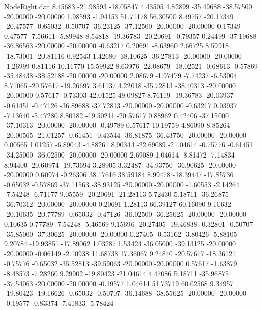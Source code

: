 \begin{filecontents}{NodeRight.dat}
   8.45683  -21.98593  -18.05847     4.43505    4.82899  -35.49688  -38.57500  -20.00000  -20.00000    1.98593   -1.94153   51.71178   56.30500
   8.49757  -20.17349  -20.47577    -0.65032   -0.50707  -36.23125  -37.12500  -20.00000  -20.00000    0.17349    0.47577   -7.56611   -5.89948
   8.54818  -19.36783  -20.20691    -0.79357    0.24499  -37.19688  -36.86563  -20.00000  -20.00000   -0.63217    0.20691   -8.63960    2.66725
   8.59918  -18.73001  -20.81116     0.92543    1.42680  -38.10625  -36.27813  -20.00000  -20.00000   -1.26999    0.81116   10.11770   15.59922
   8.63976  -22.08679  -18.02521    -0.68613   -0.57869  -35.48438  -38.52188  -20.00000  -20.00000    2.08679   -1.97479   -7.74237   -6.53004
   8.71065  -20.57617  -19.26697     3.61137    4.22018  -35.72813  -38.40313  -20.00000  -20.00000    0.57617   -0.73303   42.01525   49.09827
   8.76119  -19.36783  -20.03937    -0.61451   -0.47126  -36.89688  -37.72813  -20.00000  -20.00000   -0.63217    0.03937   -7.13640   -5.47280
   8.80182  -19.50211  -20.57617     0.88962    0.42406  -37.15000  -37.10313  -20.00000  -20.00000   -0.49789    0.57617   10.19759    4.86090
   8.85264  -20.00565  -21.01257    -0.61451   -0.43544  -36.81875  -36.43750  -20.00000  -20.00000    0.00565    1.01257   -6.89043   -4.88261
   8.90344  -22.69089  -21.04614    -0.75776   -0.61451  -34.25000  -36.02500  -20.00000  -20.00000    2.69089    1.04614   -8.81472   -7.14834
   8.94400  -20.60974  -19.73694     3.28905    3.32487  -34.93750  -36.90625  -20.00000  -20.00000    0.60974   -0.26306   38.17616   38.59184
   8.99478  -18.39447  -17.85736    -0.65032   -0.57869  -37.11563  -38.93125  -20.00000  -20.00000   -1.60553   -2.14264   -7.54248   -6.71177
   9.05559  -20.20691  -21.28113     5.72430    5.18711  -36.26875  -36.70312  -20.00000  -20.00000    0.20691    1.28113   66.39127   60.16090
   9.10632  -20.10635  -20.77789    -0.65032   -0.47126  -36.02500  -36.25625  -20.00000  -20.00000    0.10635    0.77789   -7.54248   -5.46569
   9.15696  -20.27405  -19.46838    -0.32801   -0.50707  -35.85000  -37.30625  -20.00000  -20.00000    0.27405   -0.53162   -3.80426   -5.88105
   9.20784  -19.93851  -17.89062     1.03287    1.53424  -36.05000  -39.13125  -20.00000  -20.00000   -0.06149   -2.10938   11.68738   17.36067
   9.24840  -20.57617  -18.36121    -0.75776   -0.65032  -35.52813  -39.59063  -20.00000  -20.00000    0.57617   -1.63879   -8.48573   -7.28260
   9.29902  -19.80423  -21.04614     4.47086    5.18711  -35.96875  -37.54063  -20.00000  -20.00000   -0.19577    1.04614   51.73719   60.02568
   9.34957  -19.80423  -19.16626    -0.65032   -0.50707  -36.14688  -38.55625  -20.00000  -20.00000   -0.19577   -0.83374   -7.41833   -5.78424

\end{filecontents}
